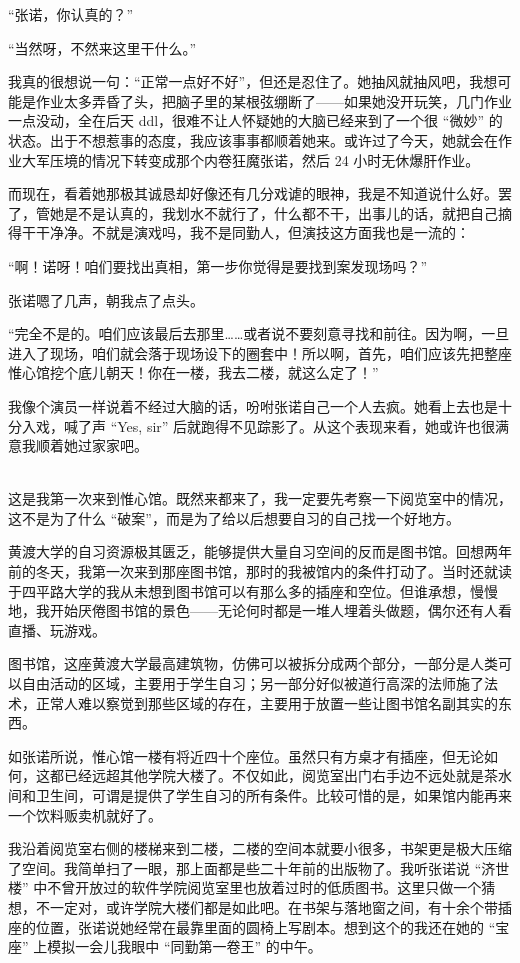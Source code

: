 \documentclass[UTF8]{ctexart}
\begin{document}
“张诺，你认真的？”

“当然呀，不然来这里干什么。”

我真的很想说一句：“正常一点好不好”，但还是忍住了。她抽风就抽风吧，我想可能是作业太多弄昏了头，把脑子里的某根弦绷断了——如果她没开玩笑，几门作业一点没动，全在后天 ddl，很难不让人怀疑她的大脑已经来到了一个很 “微妙” 的状态。出于不想惹事的态度，我应该事事都顺着她来。或许过了今天，她就会在作业大军压境的情况下转变成那个内卷狂魔张诺，然后 24 小时无休爆肝作业。

而现在，看着她那极其诚恳却好像还有几分戏谑的眼神，我是不知道说什么好。罢了，管她是不是认真的，我划水不就行了，什么都不干，出事儿的话，就把自己摘得干干净净。不就是演戏吗，我不是同勤人，但演技这方面我也是一流的：

“啊！诺呀！咱们要找出真相，第一步你觉得是要找到案发现场吗？”

张诺嗯了几声，朝我点了点头。

“完全不是的。咱们应该最后去那里……或者说不要刻意寻找和前往。因为啊，一旦进入了现场，咱们就会落于现场设下的圈套中！所以啊，首先，咱们应该先把整座惟心馆挖个底儿朝天！你在一楼，我去二楼，就这么定了！”

我像个演员一样说着不经过大脑的话，吩咐张诺自己一个人去疯。她看上去也是十分入戏，喊了声 “Yes, sir” 后就跑得不见踪影了。从这个表现来看，她或许也很满意我顺着她过家家吧。

~\\

这是我第一次来到惟心馆。既然来都来了，我一定要先考察一下阅览室中的情况，这不是为了什么 “破案”，而是为了给以后想要自习的自己找一个好地方。

黄渡大学的自习资源极其匮乏，能够提供大量自习空间的反而是图书馆。回想两年前的冬天，我第一次来到那座图书馆，那时的我被馆内的条件打动了。当时还就读于四平路大学的我从未想到图书馆可以有那么多的插座和空位。但谁承想，慢慢地，我开始厌倦图书馆的景色——无论何时都是一堆人埋着头做题，偶尔还有人看直播、玩游戏。

图书馆，这座黄渡大学最高建筑物，仿佛可以被拆分成两个部分，一部分是人类可以自由活动的区域，主要用于学生自习；另一部分好似被道行高深的法师施了法术，正常人难以察觉到那些区域的存在，主要用于放置一些让图书馆名副其实的东西。

如张诺所说，惟心馆一楼有将近四十个座位。虽然只有方桌才有插座，但无论如何，这都已经远超其他学院大楼了。不仅如此，阅览室出门右手边不远处就是茶水间和卫生间，可谓是提供了学生自习的所有条件。比较可惜的是，如果馆内能再来一个饮料贩卖机就好了。

我沿着阅览室右侧的楼梯来到二楼，二楼的空间本就要小很多，书架更是极大压缩了空间。我简单扫了一眼，那上面都是些二十年前的出版物了。我听张诺说 “济世楼” 中不曾开放过的软件学院阅览室里也放着过时的低质图书。这里只做一个猜想，不一定对，或许学院大楼们都是如此吧。在书架与落地窗之间，有十余个带插座的位置，张诺说她经常在最靠里面的圆椅上写剧本。想到这个的我还在她的 “宝座” 上模拟一会儿我眼中 “同勤第一卷王” 的中午。
\end{document}
